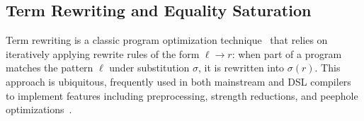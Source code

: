 


  



\subsection{Term Rewriting and Equality Saturation}

Term rewriting is a classic
  program optimization technique~\cite{baader1998term}
  that relies on iteratively applying
  rewrite rules of the form $\ell \xrightarrow{} r$:
  when part of a program
  matches the pattern $\ell$
  under substitution $\sigma$,
  it is rewritten into $\sigma(r)$.
This approach is ubiquitous,
  frequently used in both mainstream and DSL compilers
  to implement features including preprocessing,
  strength reductions, and
  peephole optimizations~\cite{garavel2018rewrite-context}.
  
